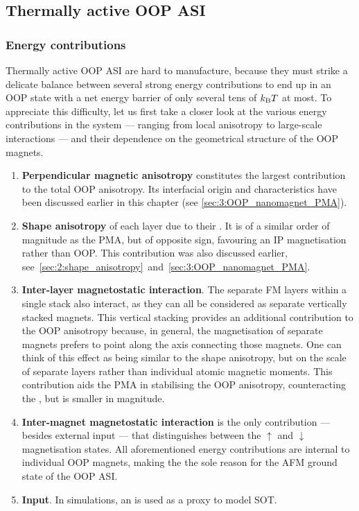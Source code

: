 \subsection{Thermally active OOP ASI}
\subsubsection{Energy contributions}
Thermally active OOP ASI are hard to manufacture, because they must strike a delicate balance between several strong energy contributions to end up in an OOP state with a net energy barrier of only several tens of $\kBT$ at most.
To appreciate this difficulty, let us first take a closer look at the various energy contributions in the system --- ranging from local anisotropy to large-scale interactions --- and their dependence on the geometrical structure of the OOP magnets.
\begin{enumerate}
	\item \textbf{Perpendicular magnetic anisotropy} constitutes the largest contribution to the total OOP anisotropy.
	Its interfacial origin and characteristics have been discussed earlier in this chapter (see \cref{sec:3:OOP_nanomagnet_PMA}). %
	\item \textbf{Shape anisotropy} of each layer due to their .
	It is of a similar order of magnitude as the PMA, but of opposite sign, favouring an IP magnetisation rather than OOP.
	This contribution was also discussed earlier, see~\cref{sec:2:shape_anisotropy}~and~\ref{sec:3:OOP_nanomagnet_PMA}. %
	\item \textbf{Inter-layer magnetostatic interaction}.
	The separate FM layers within a single stack also interact, as they can all be considered as separate vertically stacked magnets.
	This vertical stacking provides an additional contribution to the OOP anisotropy because, in general, the magnetisation of separate magnets prefers to point along the axis connecting those magnets.
	One can think of this effect as being similar to the shape anisotropy, but on the scale of separate layers rather than individual atomic magnetic moments.
	This contribution aids the PMA in stabilising the OOP anisotropy, counteracting the , but is smaller in magnitude. %
	\item \textbf{Inter-magnet magnetostatic interaction} is the only contribution --- besides external input --- that distinguishes between the $\uparrow$ and $\downarrow$ magnetisation states.
	All aforementioned energy contributions are internal to individual OOP magnets, making the  the sole reason for the AFM ground state of the OOP ASI. %
	\item \textbf{Input}.
	In simulations, an  is used as a proxy to model SOT.
\end{enumerate}
